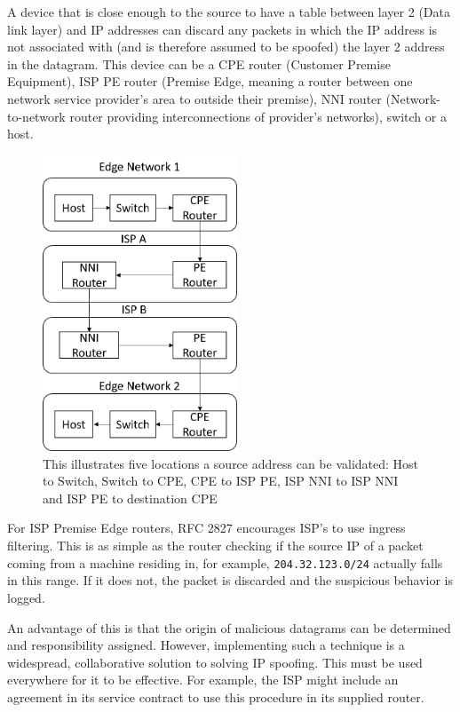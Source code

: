 \documentclass[twocolumn,10pt]{asme2ej}
\begin{document}
A device that is close enough to the source to have a table between layer 2 (Data link layer) and IP addresses can discard any packets in which the IP address is not associated with (and is therefore assumed to be spoofed) the layer 2 address in the datagram. This device can be a CPE router (Customer Premise Equipment), ISP PE router (Premise Edge, meaning a router between one network service provider's area to outside their premise), NNI router (Network-to-network router providing interconnections of provider's networks), switch or a host.

\begin{figure}[h]
	\begin{center}
		\includegraphics[width=5.79cm, height=8.82cm]{figures/eliminating2}
	\end{center}
	\caption{This illustrates five locations a source address can be validated: Host to Switch, Switch to CPE, CPE to ISP PE, ISP NNI to ISP NNI and ISP PE to destination CPE}
	\label{figure_eliminating} 
\end{figure}

For ISP Premise Edge routers, RFC 2827 \cite{rfc2827} encourages ISP's to use ingress filtering. This is as simple as the router checking if the source IP of a packet coming from a machine residing in, for example, \texttt{204.32.123.0/24} actually falls in this range. If it does not, the packet is discarded and the suspicious behavior is logged.

An advantage of this is that the origin of malicious datagrams can be determined and responsibility assigned. However, implementing such a technique is a widespread, collaborative solution to solving IP spoofing. This must be used everywhere for it to be effective. For example, the ISP might include an agreement in its service contract to use this procedure in its supplied router.
\end{document}
